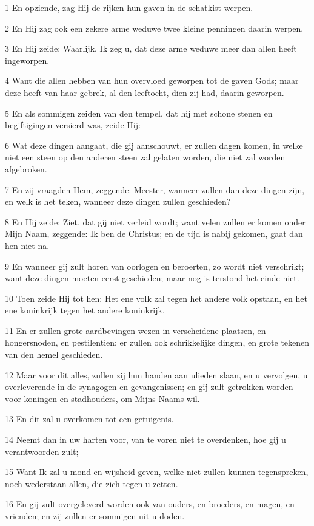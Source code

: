 \par 1 En opziende, zag Hij de rijken hun gaven in de schatkist werpen.
\par 2 En Hij zag ook een zekere arme weduwe twee kleine penningen daarin werpen.
\par 3 En Hij zeide: Waarlijk, Ik zeg u, dat deze arme weduwe meer dan allen heeft ingeworpen.
\par 4 Want die allen hebben van hun overvloed geworpen tot de gaven Gods; maar deze heeft van haar gebrek, al den leeftocht, dien zij had, daarin geworpen.
\par 5 En als sommigen zeiden van den tempel, dat hij met schone stenen en begiftigingen versierd was, zeide Hij:
\par 6 Wat deze dingen aangaat, die gij aanschouwt, er zullen dagen komen, in welke niet een steen op den anderen steen zal gelaten worden, die niet zal worden afgebroken.
\par 7 En zij vraagden Hem, zeggende: Meester, wanneer zullen dan deze dingen zijn, en welk is het teken, wanneer deze dingen zullen geschieden?
\par 8 En Hij zeide: Ziet, dat gij niet verleid wordt; want velen zullen er komen onder Mijn Naam, zeggende: Ik ben de Christus; en de tijd is nabij gekomen, gaat dan hen niet na.
\par 9 En wanneer gij zult horen van oorlogen en beroerten, zo wordt niet verschrikt; want deze dingen moeten eerst geschieden; maar nog is terstond het einde niet.
\par 10 Toen zeide Hij tot hen: Het ene volk zal tegen het andere volk opstaan, en het ene koninkrijk tegen het andere koninkrijk.
\par 11 En er zullen grote aardbevingen wezen in verscheidene plaatsen, en hongersnoden, en pestilentien; er zullen ook schrikkelijke dingen, en grote tekenen van den hemel geschieden.
\par 12 Maar voor dit alles, zullen zij hun handen aan ulieden slaan, en u vervolgen, u overleverende in de synagogen en gevangenissen; en gij zult getrokken worden voor koningen en stadhouders, om Mijns Naams wil.
\par 13 En dit zal u overkomen tot een getuigenis.
\par 14 Neemt dan in uw harten voor, van te voren niet te overdenken, hoe gij u verantwoorden zult;
\par 15 Want Ik zal u mond en wijsheid geven, welke niet zullen kunnen tegenspreken, noch wederstaan allen, die zich tegen u zetten.
\par 16 En gij zult overgeleverd worden ook van ouders, en broeders, en magen, en vrienden; en zij zullen er sommigen uit u doden.
